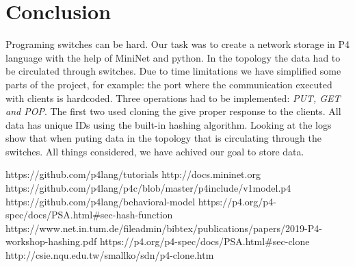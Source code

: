 \documentclass[sigconf,natbib=false]{acmart}
\begin{document}
\section{Conclusion}
Programing switches can be hard. Our task was to create a network storage in P4 language with the help of MiniNet and python. In the topology the data had to be circulated through switches. Due to time limitations we have simplified some parts of the project, for example: the port where the communication executed with clients is hardcoded. Three operations had to be implemented: \textit{PUT, GET and POP}. The first two used cloning the give proper response to the clients. All data has unique IDs using the built-in hashing algorithm. Looking at the logs show that when puting data in the topology that is circulating through the switches. All things considered, we have achived our goal to store data.

\begin{thebibliography}{2}
 https://github.com/p4lang/tutorials
 http://docs.mininet.org
 https://github.com/p4lang/p4c/blob/master/p4include/v1model.p4
 https://github.com/p4lang/behavioral-model
 https://p4.org/p4-spec/docs/PSA.html\#sec-hash-function
 https://www.net.in.tum.de/fileadmin/bibtex/publications/papers/2019-P4-workshop-hashing.pdf
 https://p4.org/p4-spec/docs/PSA.html\#sec-clone
 http://csie.nqu.edu.tw/smallko/sdn/p4-clone.htm

\end{thebibliography}


\end{document}
